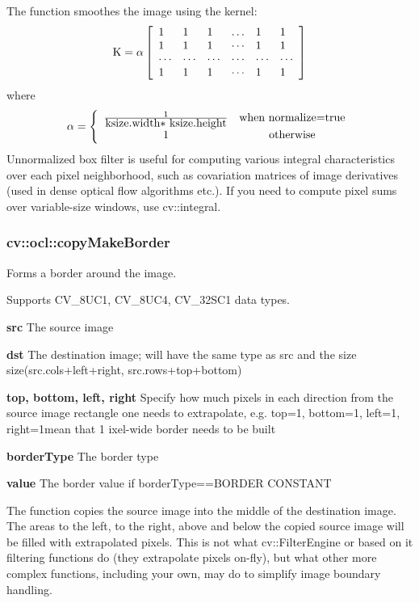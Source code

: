 \documentclass{article}
\begin{document}
The function smoothes the image using the kernel:
\[
\mbox{K}=\alpha \left[ {{\begin{array}{*{20}c}
 1 \hfill & 1 \hfill & 1 \hfill & \ldots \hfill & 1 \hfill & 1 \hfill \\
 1 \hfill & 1 \hfill & 1 \hfill & \cdots \hfill & 1 \hfill & 1 \hfill \\
 \cdots \hfill & \cdots \hfill & \cdots \hfill & \cdots \hfill & \cdots
\hfill & \cdots \hfill \\
 1 \hfill & 1 \hfill & 1 \hfill & \cdots \hfill & 1 \hfill & 1 \hfill \\
\end{array} }} \right]
\]
where
\[
\alpha =\left\{ {{\begin{array}{*{20}c}
 {\frac{1}{\mbox{ksize.width$\ast$ ksize.height}}} & {\mbox{when
normalize=true}} \\
 1 & {\mbox{otherwise}} \\
\end{array} }} \right.
\]
Unnormalized box filter is useful for computing various integral
characteristics over each pixel neighborhood, such as covariation matrices
of image derivatives (used in dense optical flow algorithms etc.). If you
need to compute pixel sums over variable-size windows, use cv::integral.

\newpage

\subsubsection{cv::ocl::copyMakeBorder}
\label{subsubsec:mylabel34}
Forms a border around the image.

Supports CV{\_}8UC1, CV{\_}8UC4, CV{\_}32SC1 data types.

\textbf{src }The source image

\textbf{dst }The destination image; will have the same type as src and the
size size(src.cols+left+right, src.rows+top+bottom)

\textbf{top, bottom, left, right }Specify how much pixels in each direction
from the source image rectangle one needs to extrapolate, e.g. top=1,
bottom=1, left=1, right=1mean that 1 ixel-wide border needs to be built

\textbf{borderType }The border type

\textbf{value }The border value if borderType==BORDER CONSTANT

The function copies the source image into the middle of the destination
image. The areas to the left, to the right, above and below the copied
source image will be filled with extrapolated pixels. This is not what
cv::FilterEngine or based on it filtering functions do (they extrapolate
pixels on-fly), but what other more complex functions, including your own,
may do to simplify image boundary handling.
\end{document}
